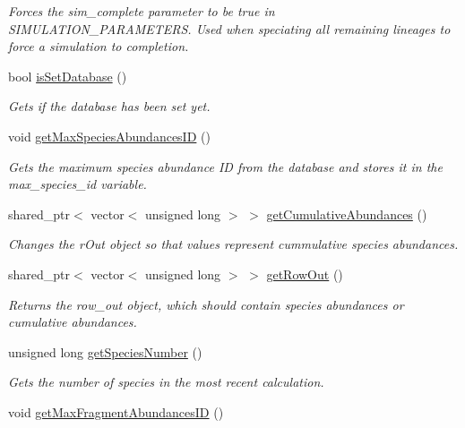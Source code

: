 \begin{DoxyCompactItemize}
\begin{DoxyCompactList}\small\item\em Forces the sim\+\_\+complete parameter to be true in S\+I\+M\+U\+L\+A\+T\+I\+O\+N\+\_\+\+P\+A\+R\+A\+M\+E\+T\+E\+RS. Used when speciating all remaining lineages to force a simulation to completion. \end{DoxyCompactList}\item 
bool \hyperlink{class_community_a88a36fd7a14c3e88af377891e01bba21}{is\+Set\+Database} ()
\begin{DoxyCompactList}\small\item\em Gets if the database has been set yet. \end{DoxyCompactList}\item 
void \hyperlink{class_community_a8ac0ce642595283f342c2f1841f4c20f}{get\+Max\+Species\+Abundances\+ID} ()
\begin{DoxyCompactList}\small\item\em Gets the maximum species abundance ID from the database and stores it in the max\+\_\+species\+\_\+id variable. \end{DoxyCompactList}\item 
shared\+\_\+ptr$<$ vector$<$ unsigned long $>$ $>$ \hyperlink{class_community_a96dbca723d1abff6eb54c8527a6f2848}{get\+Cumulative\+Abundances} ()
\begin{DoxyCompactList}\small\item\em Changes the r\+Out object so that values represent cummulative species abundances. \end{DoxyCompactList}\item 
shared\+\_\+ptr$<$ vector$<$ unsigned long $>$ $>$ \hyperlink{class_community_ae43a31b6647bf600f4ef5011bf335915}{get\+Row\+Out} ()
\begin{DoxyCompactList}\small\item\em Returns the row\+\_\+out object, which should contain species abundances or cumulative abundances. \end{DoxyCompactList}\item 
unsigned long \hyperlink{class_community_a8523432488d6586521c5994cad4215d8}{get\+Species\+Number} ()
\begin{DoxyCompactList}\small\item\em Gets the number of species in the most recent calculation. \end{DoxyCompactList}\item 
void \hyperlink{class_community_af6fe28e1047ed5b56fde833e4b2b30de}{get\+Max\+Fragment\+Abundances\+ID} ()

\end{DoxyCompactItemize}
